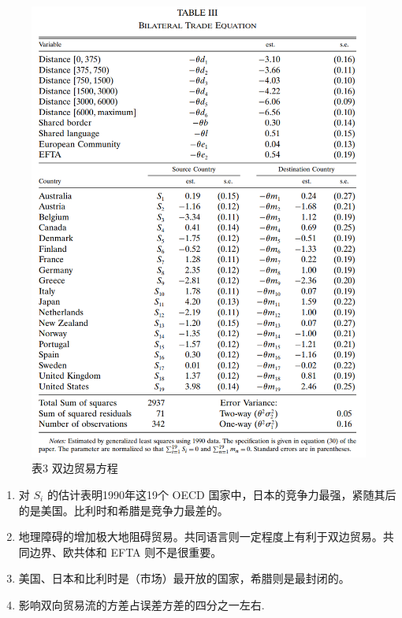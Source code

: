 \documentclass[]{tufte-handout}
\providecommand{\tightlist}{%
  \setlength{\itemsep}{0pt}\setlength{\parskip}{0pt}}
\begin{document}
\begin{figure}

{\centering \includegraphics[width=1\linewidth]{Figures/Table3} 

}

\caption[表3 双边贸易方程]{表3 双边贸易方程}\label{fig:t3}
\end{figure}

\begin{enumerate}
\def\labelenumi{\arabic{enumi}.}
\tightlist
\item
  对 \(S_i\) 的估计表明1990年这19个 OECD
  国家中，日本的竞争力最强，紧随其后的是美国。比利时和希腊是竞争力最差的。\\
\item
  地理障碍的增加极大地阻碍贸易。共同语言则一定程度上有利于双边贸易。共同边界、欧共体和
  EFTA 则不是很重要。\\
\item
  美国、日本和比利时是（市场）最开放的国家，希腊则是最封闭的。\\
\item
  影响双向贸易流的方差占误差方差的四分之一左右.
\end{enumerate}
\end{document}

